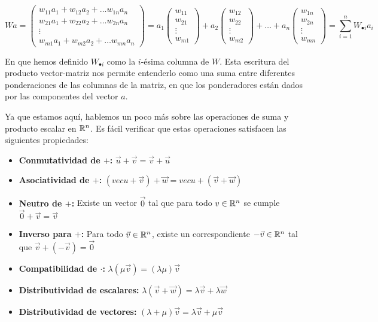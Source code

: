\[Wa = \begin{pmatrix}
    w_{11} a_1 + w_{12} a_2 + \dots w_{1n} a_n\\
    w_{21} a_1 + w_{22} a_2 + \dots w_{2n} a_n\\
    \vdots \\
    w_{m1} a_1 + w_{m2} a_2 + \dots w_{mn} a_n
\end{pmatrix} = a_1 \begin{pmatrix}
    w_{11} \\ w_{21} \\ \vdots \\ w_{m1}
\end{pmatrix} + a_2 \begin{pmatrix}
    w_{12} \\ w_{22} \\ \vdots \\ w_{m2}
\end{pmatrix} + \dots + a_n \begin{pmatrix}
    w_{1n} \\ w_{2n} \\ \vdots \\ w_{mn}
\end{pmatrix} = \sum_{i = 1}^n W_{\bullet i} a_i \]

En que hemos definido $W_{\bullet i}$ como la $i$-ésima columna de $W$. Esta escritura del producto vector-matriz nos permite entenderlo como una suma entre diferentes ponderaciones de las columnas de la matriz, en que los ponderadores están dados por las componentes del vector $a$.

Ya que estamos aquí, hablemos un poco más sobre las operaciones de suma y producto escalar en $\mathbb{R}^n$. Es fácil verificar que estas operaciones satisfacen las siguientes propiedades:
\begin{itemize}
    \item \textbf{Conmutatividad de $+$:} $\vec{u} + \vec{v} = \vec{v} + \vec{u}$
    \item \textbf{Asociatividad de $+$:} $(vec{u} + \vec{v}) + \vec{w} = vec{u} + (\vec{v} + \vec{w})$
    \item \textbf{Neutro de $+$:} Existe un vector $\vec{0}$ tal que para todo $v \in \mathbb{R}^n$ se cumple $\vec{0} + \vec{v} = \vec{v}$
    \item \textbf{Inverso para $+$:} Para todo $\vec{v} \in \mathbb{R}^n$, existe un correspondiente $-\vec{v} \in \mathbb{R}^n$ tal que $\vec{v} + (-\vec{v}) = \vec{0}$
    \item \textbf{Compatibilidad de $\cdot$:} $\lambda(\mu \vec{v}) = (\lambda \mu) \vec{v}$
    \item \textbf{Distributividad de escalares:} $\lambda(\vec{v} + \vec{w}) = \lambda\vec{v} + \lambda \vec{w}$
    \item \textbf{Distributividad de vectores:} $(\lambda + \mu)\vec{v} = \lambda \vec{v} + \mu \vec{v}$
\end{itemize}

